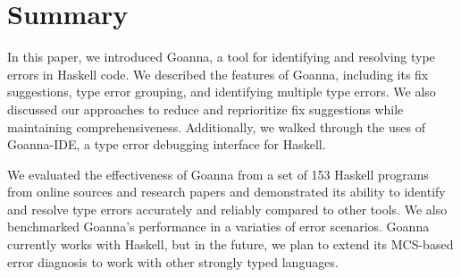 \documentclass[pdflatex,sn-mathphys-num]{sn-jnl}%
\begin{document}
\section{Summary} \label{sec:conclusion}

In this paper, we introduced Goanna, a tool for identifying and resolving type errors in Haskell code. We described the features of Goanna, including its fix suggestions, type error grouping, and identifying multiple type errors. We also discussed our approaches to reduce and reprioritize fix suggestions while maintaining comprehensiveness. Additionally, we walked through the uses of Goanna-IDE, a type error debugging interface for Haskell.

We evaluated the effectiveness of Goanna from a set of 153 Haskell programs from online sources and research papers and demonstrated its ability to identify and resolve type errors accurately and reliably compared to other tools. We also benchmarked Goanna's performance in a variaties of error scenarios. Goanna currently works with Haskell, but in the future, we plan to extend its MCS-based error diagnosis to work with other strongly typed languages.



\end{document}
